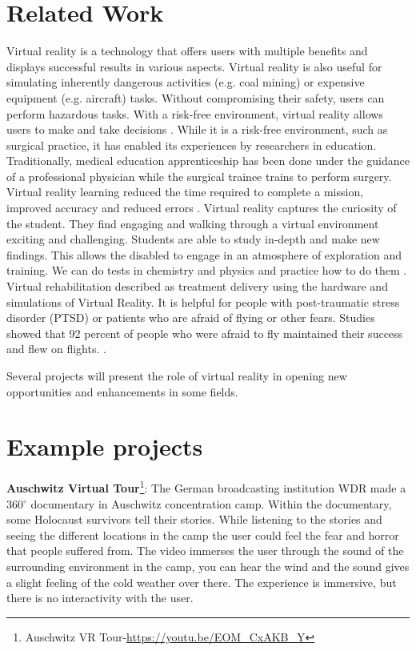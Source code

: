   
\section{Related Work}

Virtual reality is a technology that offers users with multiple benefits and displays successful results in various aspects. Virtual reality is also useful for simulating inherently dangerous activities (e.g. coal mining) or expensive equipment (e.g. aircraft) tasks. Without compromising their safety, users can perform hazardous tasks. With a risk-free environment, virtual reality allows users to make and take decisions \citep{Aguinas2004}. While it is a risk-free environment, such as surgical practice, it has enabled its experiences by researchers in education. Traditionally, medical education apprenticeship has been done under the guidance of a professional physician while the surgical trainee trains to perform surgery. Virtual reality learning reduced the time required to complete a mission, improved accuracy and reduced errors \citep{Ks2009}. Virtual reality captures the curiosity of the student. They find engaging and walking through a virtual environment exciting and challenging. Students are able to study in-depth and make new findings. This allows the disabled to engage in an atmosphere of exploration and training. We can do tests in chemistry and physics and practice how to do them \citep{Pantelidis2010}. Virtual rehabilitation described as treatment delivery using the hardware and simulations of Virtual Reality. It is helpful for people with post-traumatic stress disorder (PTSD) or patients who are afraid of flying or other fears. Studies showed that 92 percent of people who were afraid to fly maintained their success and flew on flights. \citep{Burdea2003}.


Several projects will present the role of virtual reality in opening new opportunities and enhancements in some fields.










\section{Example projects}

\textbf{Auschwitz Virtual Tour}\footnote{Auschwitz VR Tour-\url{https://youtu.be/EOM_CxAKB_Y}}: The German broadcasting institution WDR made a 360$^{\circ}$
documentary in Auschwitz concentration camp. Within the documentary, some Holocaust
survivors tell their stories. While listening to the stories and seeing the different locations in
the camp the user could feel the fear and horror that people suffered from. The video
immerses the user through the sound of the surrounding environment in the camp, you can
hear the wind and the sound gives a slight feeling of the cold weather over there. The
experience is immersive, but there is no interactivity with the user.


